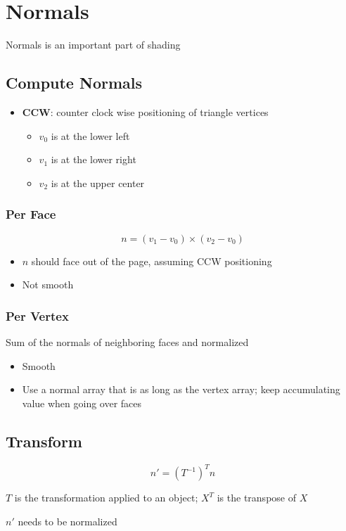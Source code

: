 \section{Normals}

Normals is an important part of shading

\subsection{Compute Normals}

  \begin{itemize}
    \item \textbf{CCW}: counter clock wise positioning of triangle vertices
    \begin{itemize}
      \item $ v_{0} $ is at the lower left
      \item $ v_{1} $ is at the lower right
      \item $ v_{2} $ is at the upper center
    \end{itemize}
  \end{itemize}

  \subsubsection{Per Face}

    \begin{equation}
      n = \left( v_{1} - v_{0} \right) \times \left( v_{2} - v_{0} \right)
    \end{equation}

    \begin{itemize}
      \item $ n $ should face out of the page, assuming CCW positioning
      \item Not smooth
    \end{itemize}

  \subsubsection{Per Vertex}

    Sum of the normals of neighboring faces and normalized

    \begin{itemize}
      \item Smooth
      \item Use a normal array that is as long as the vertex array; keep
      accumulating value when going over faces
    \end{itemize}

\subsection{Transform}

  \begin{equation}
    n' = \left( T^{-1} \right)^{T} n
  \end{equation}

  $ T $ is the transformation applied to an object; $ X^{T} $ is the transpose
  of $ X $

  $ n' $ needs to be normalized
